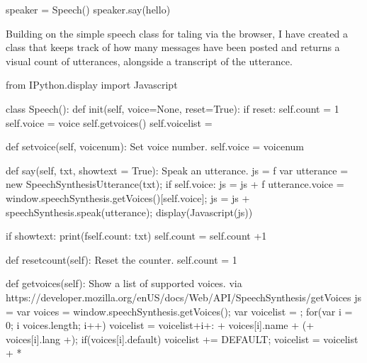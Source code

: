\documentclass[letterpaper,10pt,english]{sphinxmanual}
\begin{document}
{{\begin{sphinxVerbatim}[commandchars=\\\{\}]
speaker = Speech()
speaker.say(\PYGZsq{}hello\PYGZsq{})
\end{sphinxVerbatim}
}

Building on the simple speech class for taling via the browser, I have created a class that keeps track of how many messages have been posted and returns a visual count of utterances, alongside a transcript of the utterance.

{
\begin{sphinxVerbatim}[commandchars=\\\{\}]
\llap{\color{nbsphinxin}[ ]:\,\hspace{\fboxrule}\hspace{\fboxsep}}from IPython.display import Javascript

class Speech():
    def \PYGZus{}\PYGZus{}init\PYGZus{}\PYGZus{}(self, voice=None, reset=True):
        if reset:
            self.count = 1
        self.voice = voice
        self.\PYGZus{}get\PYGZus{}voices()
        self.voicelist = \PYGZsq{}\PYGZsq{}

    def set\PYGZus{}voice(self, voicenum):
        \PYGZdq{}\PYGZdq{}\PYGZdq{}Set voice number.\PYGZdq{}\PYGZdq{}\PYGZdq{}
        self.voice = voicenum

    def say(self, txt, showtext = True):
        \PYGZdq{}\PYGZdq{}\PYGZdq{}Speak an utterance.\PYGZdq{}\PYGZdq{}\PYGZdq{}
        js = f\PYGZsq{}\PYGZsq{}\PYGZsq{}
        var utterance = new SpeechSynthesisUtterance(\PYGZdq{}\PYGZob{}txt\PYGZcb{}\PYGZdq{});
        \PYGZsq{}\PYGZsq{}\PYGZsq{}
        if self.voice:
            js = js + f\PYGZsq{}\PYGZsq{}\PYGZsq{}
            utterance.voice = window.speechSynthesis.getVoices()[\PYGZob{}self.voice\PYGZcb{}];
            \PYGZsq{}\PYGZsq{}\PYGZsq{}
        js = js + \PYGZsq{}speechSynthesis.speak(utterance);\PYGZsq{}
        display(Javascript(js))

        if showtext:
            print(f\PYGZsq{}\PYGZob{}self.count\PYGZcb{}: \PYGZob{}txt\PYGZcb{}\PYGZsq{})
        self.count = self.count +1

    def reset\PYGZus{}count(self):
        \PYGZdq{}\PYGZdq{}\PYGZdq{}Reset the counter.\PYGZdq{}\PYGZdq{}\PYGZdq{}
        self.count = 1

    def \PYGZus{}get\PYGZus{}voices(self):
        \PYGZdq{}\PYGZdq{}\PYGZdq{}Show a list of supported voices.\PYGZdq{}\PYGZdq{}\PYGZdq{}
        \PYGZsh{} via https://developer.mozilla.org/en\PYGZhy{}US/docs/Web/API/SpeechSynthesis/getVoices
        js = \PYGZsq{}\PYGZsq{}\PYGZsq{}
        var voices =  window.speechSynthesis.getVoices();
    var voicelist = \PYGZsq{}\PYGZsq{};
   for(var i = 0; i \PYGZlt{} voices.length; i++) \PYGZob{}
   voicelist = voicelist+i+\PYGZsq{}: \PYGZsq{}+ voices[i].name + \PYGZsq{} (\PYGZsq{}+ voices[i].lang +\PYGZsq{})\PYGZsq{};
    if(voices[i].default) \PYGZob{}
      voicelist += \PYGZsq{} \PYGZhy{}\PYGZhy{} DEFAULT\PYGZsq{};
    \PYGZcb{}
   voicelist = voicelist + \PYGZsq{}*\PYGZsq{}
  \PYGZcb{}


\end{sphinxVerbatim}}}
\end{document}

